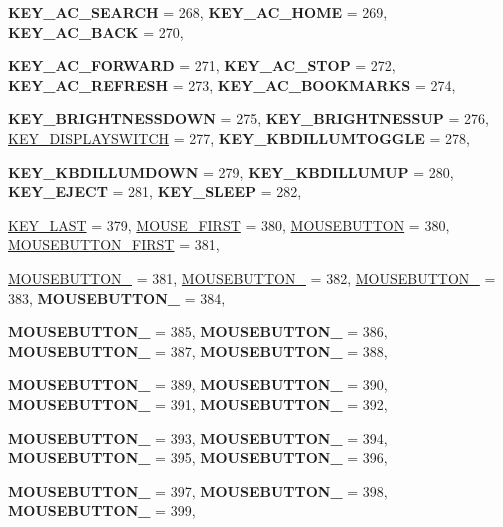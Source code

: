 \begin{DoxyCompactItemize}
{\bfseries KEY\_\-AC\_\-SEARCH} =  268, 
{\bfseries KEY\_\-AC\_\-HOME} =  269, 
{\bfseries KEY\_\-AC\_\-BACK} =  270, 
\par
{\bfseries KEY\_\-AC\_\-FORWARD} =  271, 
{\bfseries KEY\_\-AC\_\-STOP} =  272, 
{\bfseries KEY\_\-AC\_\-REFRESH} =  273, 
{\bfseries KEY\_\-AC\_\-BOOKMARKS} =  274, 
\par
{\bfseries KEY\_\-BRIGHTNESSDOWN} =  275, 
{\bfseries KEY\_\-BRIGHTNESSUP} =  276, 
\hyperlink{classphys_1_1MetaCode_a3e501cbb5bf0f6f1fdb7211465bda8d8aadc4c974c86930fa73a693b7db4f7755}{KEY\_\-DISPLAYSWITCH} =  277, 
{\bfseries KEY\_\-KBDILLUMTOGGLE} =  278, 
\par
{\bfseries KEY\_\-KBDILLUMDOWN} =  279, 
{\bfseries KEY\_\-KBDILLUMUP} =  280, 
{\bfseries KEY\_\-EJECT} =  281, 
{\bfseries KEY\_\-SLEEP} =  282, 
\par
\hyperlink{classphys_1_1MetaCode_a3e501cbb5bf0f6f1fdb7211465bda8d8ac5e120aa1595bf2aa260df14b4a3498b}{KEY\_\-LAST} =  379, 
\hyperlink{classphys_1_1MetaCode_a3e501cbb5bf0f6f1fdb7211465bda8d8a1bb7f008c7d430e886141a3b8b697129}{MOUSE\_\-FIRST} =  380, 
\hyperlink{classphys_1_1MetaCode_a3e501cbb5bf0f6f1fdb7211465bda8d8a9cc80a2db206fb540fbb92a8ff64268a}{MOUSEBUTTON} =  380, 
\hyperlink{classphys_1_1MetaCode_a3e501cbb5bf0f6f1fdb7211465bda8d8a92ee5571be5e198a62eda83f27b27ab8}{MOUSEBUTTON\_\-FIRST} =  381, 
\par
\hyperlink{classphys_1_1MetaCode_a3e501cbb5bf0f6f1fdb7211465bda8d8ab9dca2791ddf9838ec7ef94d03392279}{MOUSEBUTTON\_} =  381, 
\hyperlink{classphys_1_1MetaCode_a3e501cbb5bf0f6f1fdb7211465bda8d8a9b823314bfb9f39a069a909cf8075c48}{MOUSEBUTTON\_} =  382, 
\hyperlink{classphys_1_1MetaCode_a3e501cbb5bf0f6f1fdb7211465bda8d8a0ae247793a772d53d3dd6b4c84fef69d}{MOUSEBUTTON\_} =  383, 
{\bfseries MOUSEBUTTON\_} =  384, 
\par
{\bfseries MOUSEBUTTON\_} =  385, 
{\bfseries MOUSEBUTTON\_} =  386, 
{\bfseries MOUSEBUTTON\_} =  387, 
{\bfseries MOUSEBUTTON\_} =  388, 
\par
{\bfseries MOUSEBUTTON\_} =  389, 
{\bfseries MOUSEBUTTON\_} =  390, 
{\bfseries MOUSEBUTTON\_} =  391, 
{\bfseries MOUSEBUTTON\_} =  392, 
\par
{\bfseries MOUSEBUTTON\_} =  393, 
{\bfseries MOUSEBUTTON\_} =  394, 
{\bfseries MOUSEBUTTON\_} =  395, 
{\bfseries MOUSEBUTTON\_} =  396, 
\par
{\bfseries MOUSEBUTTON\_} =  397, 
{\bfseries MOUSEBUTTON\_} =  398, 
{\bfseries MOUSEBUTTON\_} =  399, 

\end{DoxyCompactItemize}
